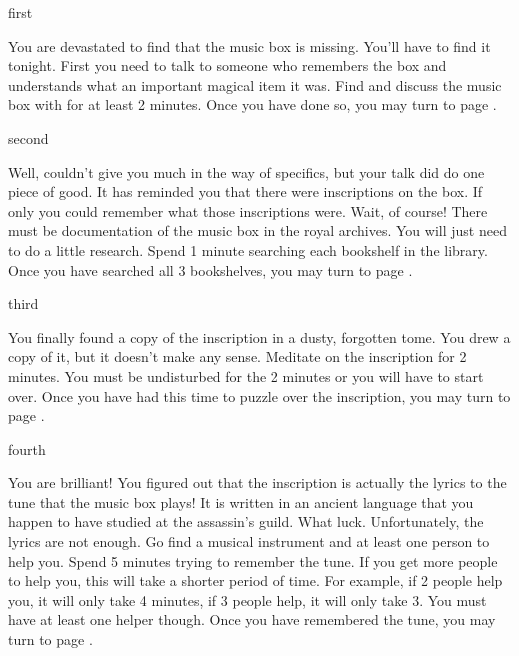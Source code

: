 \documentclass[greennotebook]{NeptuneBall}
\begin{document}

\startnotebook{\nMusicBox{}}

\begin{page}{first}

You are devastated to find that the music box is missing. You'll have to find it tonight. First you need to talk to someone who remembers the box and understands what an important magical item it was. Find \cManta{} and discuss the music box with \cManta{\them} for at least 2 minutes. Once you have done so, you may turn to page .

\end{page}

\begin{page}{second}

Well, \cManta{} couldn't give you much in the way of specifics, but your talk did do one piece of good. It has reminded you that there were inscriptions on the box. If only you could remember what those inscriptions were. Wait, of course! There must be documentation of the music box in the royal archives. You will just need to do a little research. Spend 1 minute searching each bookshelf in the library. Once you have searched all 3 bookshelves, you may turn to page .

\end{page}

\begin{page}{third}

You finally found a copy of the inscription in a dusty, forgotten tome. You drew a copy of it, but it doesn't make any sense. Meditate on the inscription for 2 minutes. You must be undisturbed for the 2 minutes or you will have to start over. Once you have had this time to puzzle over the inscription, you may turn to page .

\end{page}

\begin{page}{fourth}

You are brilliant! You figured out that the inscription is actually the lyrics to the tune that the music box plays! It is written in an ancient language that you happen to have studied at the assassin's guild. What luck. Unfortunately, the lyrics are not enough. Go find a musical instrument and at least one person to help you. Spend 5 minutes trying to remember the tune. If you get more people to help you, this will take a shorter period of time. For example, if 2 people help you, it will only take 4 minutes, if 3 people help, it will only take 3. You must have at least one helper though. Once you have remembered the tune, you may turn to page .

\end{page}
\end{document}
